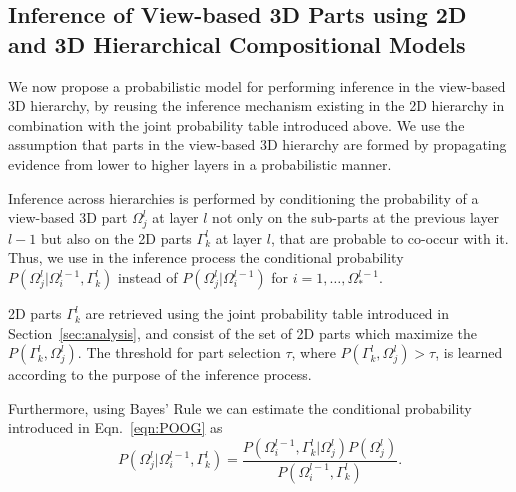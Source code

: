 \documentclass[runningheads]{llncs}
\begin{document}
\subsection{Inference of View-based 3D Parts using 2D and 3D Hierarchical Compositional Models}
\label{sec:inference}

We now propose a probabilistic model for performing inference in the view-based 3D hierarchy, by reusing the inference mechanism existing in the 2D hierarchy in combination with the joint probability table introduced above.
We use the assumption that parts in the view-based 3D hierarchy are formed by propagating evidence from lower to higher layers in a probabilistic manner. 

Inference across hierarchies is performed by conditioning the probability of a view-based 3D part $\Omega_j^{l}$ at layer $l$ not only on the sub-parts at the previous layer $l-1$ but also on the 2D parts $\Gamma_k^l$ at layer $l$, that are probable to co-occur with it. Thus, we use in the inference process the conditional probability $P(\Omega_j^{l} \vert \Omega_i^{l-1},\Gamma_k^l)$ instead of $P(\Omega_j^{l} \vert \Omega_i^{l-1})$ for $i=1,\dots,\Omega_*^{l-1}$.

2D parts $\Gamma_k^l$ are retrieved using the joint probability table introduced in Section~\ref{sec:analysis}, and consist of the set of 2D parts which maximize the $P(\Gamma_k^l,\Omega_j^l)$. The threshold for part selection $\tau$, where $P(\Gamma_k^l,\Omega_j^l)>\tau$, is learned according to the purpose of the inference process.

Furthermore, using Bayes' Rule we can estimate the conditional probability introduced in Eqn.~\ref{eqn:POOG} as
\begin{equation}
  P(\Omega_j^{l} \vert \Omega_i^{l-1},\Gamma_k^l) = \frac{P(\Omega_i^{l-1},\Gamma_k^l \vert \Omega_j^{l})P(\Omega_j^{l})}{P(\Omega_i^{l-1},\Gamma_k^l)}.
  \label{eqn:POOG.Bayes}
\end{equation}
\end{document}
